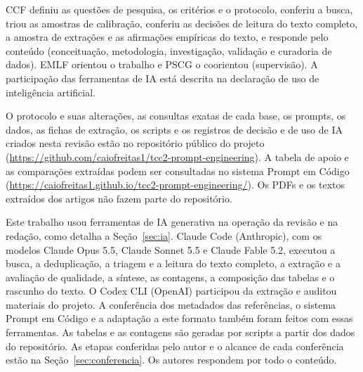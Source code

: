 \begin{declarations}

\begin{contributions}
CCF definiu as questões de pesquisa, os critérios e o protocolo, conferiu a busca, triou as amostras de calibração,
conferiu as decisões de leitura do texto completo, a amostra de extrações e as afirmações empíricas do texto, e
responde pelo conteúdo (conceituação, metodologia, investigação, validação e curadoria de dados). EMLF orientou o
trabalho e PSCG o coorientou (supervisão). A participação das ferramentas de IA está descrita na declaração de uso
de inteligência artificial.
\end{contributions}

\begin{interests}
\end{interests}

\begin{materials}
O protocolo e suas alterações, as consultas exatas de cada base, os prompts, os dados, as fichas de extração, os
scripts e os registros de decisão e de uso de IA criados nesta revisão estão no repositório público do projeto
(\url{https://github.com/caiofreitas1/tcc2-prompt-engineering}). A tabela de apoio e as comparações extraídas podem
ser consultadas no sistema Prompt em Código (\url{https://caiofreitas1.github.io/tcc2-prompt-engineering/}). Os PDFs
e os textos extraídos dos artigos não fazem parte do repositório.
\end{materials}

\begin{aitools}
Este trabalho usou ferramentas de IA generativa na operação da revisão e na redação, como detalha a
Seção~\ref{sec:ia}. Claude Code (Anthropic), com os modelos Claude Opus 5.5, Claude Sonnet 5.5 e Claude Fable 5.2,
executou a busca, a deduplicação, a triagem e a leitura do texto completo, a extração e a avaliação de qualidade, a
síntese, as contagens, a composição das tabelas e o rascunho do texto. O Codex CLI (OpenAI) participou da extração
e auditou materiais do projeto. A conferência dos metadados das referências, o sistema Prompt em Código e a
adaptação a este formato também foram feitos com essas ferramentas. As tabelas e as contagens são geradas por
scripts a partir dos dados do repositório. As etapas conferidas pelo autor e o alcance de cada conferência estão na
Seção~\ref{sec:conferencia}. Os autores respondem por todo o conteúdo.
\end{aitools}


\end{declarations}
